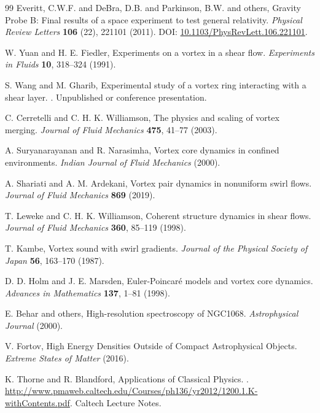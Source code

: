 \documentclass[a4paper, aps,preprint,superscriptaddress, 12pt]{revtex4}
\begin{document}
\begin{thebibliography}{99}
Everitt, C.W.F. and DeBra, D.B. and Parkinson, B.W. and others,
\newblock Gravity Probe B: Final results of a space experiment to test general relativity.
\textit{Physical Review Letters} \textbf{106} (22), 221101 (2011).
\newblock DOI: \href{https://doi.org/10.1103/PhysRevLett.106.221101}{10.1103/PhysRevLett.106.221101}.


W. Yuan and H. E. Fiedler,
\newblock Experiments on a vortex in a shear flow.
\textit{Experiments in Fluids} \textbf{10}, 318--324 (1991).


S. Wang and M. Gharib,
\newblock Experimental study of a vortex ring interacting with a shear layer.
.
\newblock Unpublished or conference presentation.


C. Cerretelli and C. H. K. Williamson,
\newblock The physics and scaling of vortex merging.
\textit{Journal of Fluid Mechanics} \textbf{475}, 41--77 (2003).


A. Suryanarayanan and R. Narasimha,
\newblock Vortex core dynamics in confined environments.
\textit{Indian Journal of Fluid Mechanics} (2000).


A. Shariati and A. M. Ardekani,
\newblock Vortex pair dynamics in nonuniform swirl flows.
\textit{Journal of Fluid Mechanics} \textbf{869} (2019).


T. Leweke and C. H. K. Williamson,
\newblock Coherent structure dynamics in shear flows.
\textit{Journal of Fluid Mechanics} \textbf{360}, 85--119 (1998).


T. Kambe,
\newblock Vortex sound with swirl gradients.
\textit{Journal of the Physical Society of Japan} \textbf{56}, 163--170 (1987).


D. D. Holm and J. E. Marsden,
\newblock Euler-Poincaré models and vortex core dynamics.
\textit{Advances in Mathematics} \textbf{137}, 1--81 (1998).


E. Behar and others,
\newblock High-resolution spectroscopy of NGC1068.
\textit{Astrophysical Journal} (2000).


V. Fortov,
\newblock High Energy Densities Outside of Compact Astrophysical Objects.
\textit{Extreme States of Matter} (2016).


K. Thorne and R. Blandford,
\newblock Applications of Classical Physics.
.
\newblock \url{http://www.pmaweb.caltech.edu/Courses/ph136/yr2012/1200.1.K-withContents.pdf}.
\newblock Caltech Lecture Notes.



\end{thebibliography}
\end{document}
